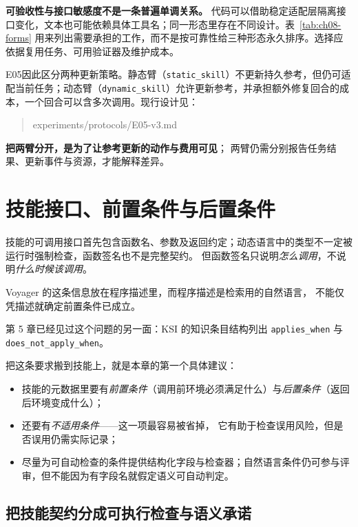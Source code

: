 \begin{principlebox}
\textbf{可验收性与接口敏感度不是一条普遍单调关系。}
代码可以借助稳定适配层隔离接口变化，文本也可能依赖具体工具名；同一形态里存在不同设计。表~\ref{tab:ch08-forms} 用来列出需要承担的工作，而不是按可靠性给三种形态永久排序。选择应依据复用任务、可用验证器及维护成本。
\end{principlebox}

E05因此区分两种更新策略。静态臂（\texttt{static\_skill}）不更新持久参考，但仍可适配当前任务；动态臂（\texttt{dynamic\_skill}）允许更新参考，并承担额外修复回合的成本，一个回合可以含多次调用。现行设计见：
\begin{quote}\ttfamily
experiments/protocols/E05-v3.md
\end{quote}
\textbf{把两臂分开，是为了让参考更新的动作与费用可见}；
两臂仍需分别报告任务结果、更新事件与资源，才能解释差异。

\section{技能接口、前置条件与后置条件}
\label{sec:ch08-interface}

技能的可调用接口首先包含函数名、参数及返回约定；动态语言中的类型不一定被运行时强制检查，函数签名也不是完整契约。
但函数签名只说明\emph{怎么调用}，不说明\emph{什么时候该调用}。

Voyager 的这条信息放在程序描述里，而程序描述是检索用的自然语言，
不能仅凭描述就确定前置条件已成立\cite{voyager-2305}。
\begin{sloppypar}
第 5 章已经见过这个问题的另一面：KSI 的知识条目结构列出
\texttt{applies\_when} 与 \texttt{does\_not\_apply\_when}\cite{ksi-2607}。
\end{sloppypar}
把这条要求搬到技能上，就是本章的第一个具体建议：
\begin{itemize}
  \item 技能的元数据里要有\emph{前置条件}（调用前环境必须满足什么）与\emph{后置条件}（返回后环境变成什么）；
  \item 还要有\emph{不适用条件}——这一项最容易被省掉，
        它有助于检查误用风险，但是否误用仍需实际记录；
  \item 尽量为可自动检查的条件提供结构化字段与检查器；自然语言条件仍可参与评审，但不能因为有字段名就假定语义可自动判定。
\end{itemize}

\subsection{把技能契约分成可执行检查与语义承诺}
\label{sec:ch08-contract-layers}

